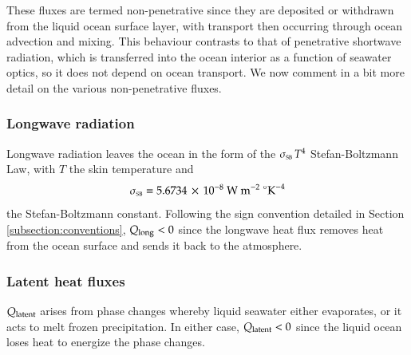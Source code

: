 These fluxes are termed non-penetrative since they are deposited or
withdrawn from the liquid ocean surface layer, with transport then
occurring through ocean advection and mixing.  This behaviour
contrasts to that of penetrative shortwave radiation, which is
transferred into the ocean interior as a function of seawater optics,
so it does not depend on ocean transport.  We now comment in a bit
more detail on the various non-penetrative fluxes.

\subsubsection{Longwave radiation}

Longwave radiation leaves the ocean in the form of the
$\sigma_{\mbox{\tiny SB}}\, T^{4}$ Stefan-Boltzmann Law, with $T$ the
skin temperature and 
\begin{equation}
\sigma_{\mbox{\tiny SB}} = 5.6734 \, \times \, 10^{-8}~\mbox{W}~\mbox{m}^{-2}~\mbox{}^{\circ}\mbox{K}^{-4}
\end{equation}
the Stefan-Boltzmann constant.  Following the sign convention detailed
in Section \ref{subsection:conventions}, $Q_{\mbox{\scriptsize long}}
<0$ since the longwave heat flux removes heat from the ocean surface
and sends it back to the atmosphere.


\subsubsection{Latent heat fluxes}

$Q_{\mbox{\scriptsize latent}}$ arises from phase changes whereby
liquid seawater either evaporates, or it acts to melt frozen
precipitation.  In either case, $Q_{\mbox{\scriptsize latent}} < 0$
since the liquid ocean loses heat to energize the phase changes.

